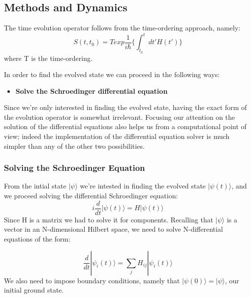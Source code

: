     \subsection{Methods and Dynamics}
        The time evolution operator follows from the time-ordering approach, namely:
          \begin{equation}
            S(t,t_0) = T exp \frac{1}{i\hbar}\Big\{ \int_{t_0}^{t} dt' H(t')\Big\}
          \end{equation}
        where T is the time-ordering.

        \noindent
        In order to find the evolved state we can proceed in the following ways:
        \begin{itemize}
          \item \textbf{Solve the Schroedinger differential equation}
        \end{itemize}
        Since we're only interested in finding the evolved state, having the exact form of the evolution operator is somewhat irrelevant. Focusing our attention on the solution of the differential equations also helps us from a computational point of view; indeed the implementation of the differential equation solver is much simpler than any of the other two possibilities.

            \subsubsection*{Solving the Schroedinger Equation}
            From the intial state $|\psi\rangle$ we're intested in finding the evolved state $|\psi(t)\rangle$, and we proceed solving the differential Schroedinger equation:
              \begin{equation}
                i\frac{d}{dt}|\psi(t)\rangle = H |\psi(t)\rangle
              \end{equation}
            Since H is a matrix we had to solve it for components. Recalling that $|\psi\rangle$ is a vector in an N-dimensional Hilbert space, we need to solve N-differential equations of the form:

              \begin{equation}
              \frac{d}{dt}|\psi_i(t)\rangle = \sum_jH_{ij}|\psi_i(t)\rangle
              \end{equation}
            We also need to impose boundary conditions, namely that $|\psi(0)\rangle = |\psi\rangle$, our initial ground state.

